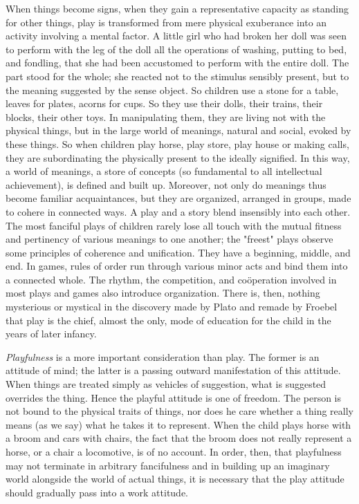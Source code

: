 \documentclass[showtrims,ustradepaper]{memoir}
\begin{document}

When things become signs, when they gain a representative capacity as
standing for other things, play is transformed from mere physical
exuberance into an activity involving a mental factor. A little girl who
had broken her doll was seen to perform with the leg of the doll all the
operations of washing, putting to bed, and fondling, that she had been
accustomed to perform with the entire doll. The part stood for the
whole; she reacted not to the stimulus sensibly present, but to the
meaning suggested by the sense object. So children use a stone for a
table, leaves for plates, acorns for cups. So they use their dolls,
their trains, their blocks, their other toys. In manipulating them, they
are living not with the physical things, but in the large world of
meanings, natural and social, evoked by these things. So when children
play horse, play store, play house or making calls, they are
subordinating the physically present to the ideally signified. In this
way, a world of meanings, a store of concepts (so fundamental to all
intellectual achievement), is defined and built
up.
Moreover, not only do meanings thus become familiar acquaintances, but
they are organized, arranged in groups, made to cohere in connected
ways. A play and a story blend insensibly into each other. The most
fanciful plays of children rarely lose all touch with the mutual fitness
and pertinency of various meanings to one another; the "freest" plays
observe some principles of coherence and unification. They have a
beginning, middle, and end. In games, rules of order run through various
minor acts and bind them into a connected whole. The rhythm, the
competition, and coöperation involved in most plays and games also
introduce organization. There is, then, nothing mysterious or mystical
in the discovery made by Plato and remade by Froebel that play is the
chief, almost the only, mode of education for the child in the years of
later infancy.


\emph{Playfulness} is a more important consideration than play. The
former is an attitude of mind; the latter is a passing outward
manifestation of this attitude. When things are treated simply as
vehicles of suggestion, what is suggested overrides the thing. Hence the
playful attitude is one of freedom. The person is not bound to the
physical traits of things, nor does he care whether a thing really means
(as we say) what he takes it to represent. When the child plays horse
with a broom and cars with chairs, the fact that the broom does not
really represent a horse, or a chair a locomotive, is of no account. In
order, then, that playfulness may not terminate in arbitrary
fancifulness and in building up an imaginary world alongside the world
of actual things, it is necessary that the play attitude should
gradually pass into a work attitude.
\end{document}
